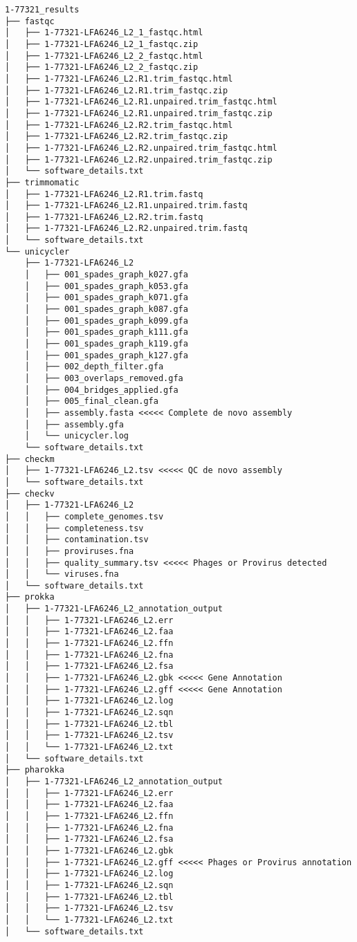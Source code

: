 \documentclass[
]{book}
\begin{document}
\begin{verbatim}
1-77321_results
├── fastqc
│   ├── 1-77321-LFA6246_L2_1_fastqc.html
│   ├── 1-77321-LFA6246_L2_1_fastqc.zip
│   ├── 1-77321-LFA6246_L2_2_fastqc.html
│   ├── 1-77321-LFA6246_L2_2_fastqc.zip
│   ├── 1-77321-LFA6246_L2.R1.trim_fastqc.html
│   ├── 1-77321-LFA6246_L2.R1.trim_fastqc.zip
│   ├── 1-77321-LFA6246_L2.R1.unpaired.trim_fastqc.html
│   ├── 1-77321-LFA6246_L2.R1.unpaired.trim_fastqc.zip
│   ├── 1-77321-LFA6246_L2.R2.trim_fastqc.html
│   ├── 1-77321-LFA6246_L2.R2.trim_fastqc.zip
│   ├── 1-77321-LFA6246_L2.R2.unpaired.trim_fastqc.html
│   ├── 1-77321-LFA6246_L2.R2.unpaired.trim_fastqc.zip
│   └── software_details.txt
├── trimmomatic
│   ├── 1-77321-LFA6246_L2.R1.trim.fastq
│   ├── 1-77321-LFA6246_L2.R1.unpaired.trim.fastq
│   ├── 1-77321-LFA6246_L2.R2.trim.fastq
│   ├── 1-77321-LFA6246_L2.R2.unpaired.trim.fastq
│   └── software_details.txt
└── unicycler
    ├── 1-77321-LFA6246_L2
    │   ├── 001_spades_graph_k027.gfa
    │   ├── 001_spades_graph_k053.gfa
    │   ├── 001_spades_graph_k071.gfa
    │   ├── 001_spades_graph_k087.gfa
    │   ├── 001_spades_graph_k099.gfa
    │   ├── 001_spades_graph_k111.gfa
    │   ├── 001_spades_graph_k119.gfa
    │   ├── 001_spades_graph_k127.gfa
    │   ├── 002_depth_filter.gfa
    │   ├── 003_overlaps_removed.gfa
    │   ├── 004_bridges_applied.gfa
    │   ├── 005_final_clean.gfa
    │   ├── assembly.fasta <<<<< Complete de novo assembly
    │   ├── assembly.gfa
    │   └── unicycler.log
    └── software_details.txt
├── checkm
│   ├── 1-77321-LFA6246_L2.tsv <<<<< QC de novo assembly
│   └── software_details.txt
├── checkv 
│   ├── 1-77321-LFA6246_L2
│   │   ├── complete_genomes.tsv
│   │   ├── completeness.tsv
│   │   ├── contamination.tsv
│   │   ├── proviruses.fna
│   │   ├── quality_summary.tsv <<<<< Phages or Provirus detected
│   │   └── viruses.fna
│   └── software_details.txt
├── prokka
│   ├── 1-77321-LFA6246_L2_annotation_output
│   │   ├── 1-77321-LFA6246_L2.err
│   │   ├── 1-77321-LFA6246_L2.faa
│   │   ├── 1-77321-LFA6246_L2.ffn
│   │   ├── 1-77321-LFA6246_L2.fna
│   │   ├── 1-77321-LFA6246_L2.fsa
│   │   ├── 1-77321-LFA6246_L2.gbk <<<<< Gene Annotation
│   │   ├── 1-77321-LFA6246_L2.gff <<<<< Gene Annotation
│   │   ├── 1-77321-LFA6246_L2.log
│   │   ├── 1-77321-LFA6246_L2.sqn
│   │   ├── 1-77321-LFA6246_L2.tbl
│   │   ├── 1-77321-LFA6246_L2.tsv
│   │   └── 1-77321-LFA6246_L2.txt
│   └── software_details.txt
├── pharokka
│   ├── 1-77321-LFA6246_L2_annotation_output
│   │   ├── 1-77321-LFA6246_L2.err
│   │   ├── 1-77321-LFA6246_L2.faa
│   │   ├── 1-77321-LFA6246_L2.ffn
│   │   ├── 1-77321-LFA6246_L2.fna
│   │   ├── 1-77321-LFA6246_L2.fsa
│   │   ├── 1-77321-LFA6246_L2.gbk
│   │   ├── 1-77321-LFA6246_L2.gff <<<<< Phages or Provirus annotation
│   │   ├── 1-77321-LFA6246_L2.log
│   │   ├── 1-77321-LFA6246_L2.sqn
│   │   ├── 1-77321-LFA6246_L2.tbl
│   │   ├── 1-77321-LFA6246_L2.tsv
│   │   └── 1-77321-LFA6246_L2.txt
│   └── software_details.txt

  
\end{verbatim}
\end{document}
